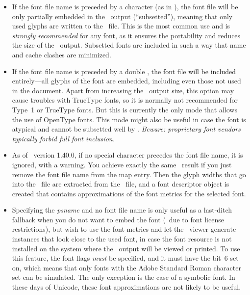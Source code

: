 \documentclass{pdftexmanual}
\begin{document}
\begin{itemize}
\item  If the font file name is preceded by a \type{<} character
       (as in ), the font file will be only partially
       embedded in the \PDF\ output (``subsetted''), meaning that only
       used glyphs are written to the \PDF\ file. This is the most
       common use and is \emph{strongly recommended} for any font, as it
       ensures the portability and reduces the size of the \PDF\ output.
       Subsetted fonts are included in such a way that name and cache
       clashes are minimized.

\item  If the font file name is preceded by a double \type{<<}, the font
       file will be included entirely---all glyphs of the font are
       embedded, including even those not used in the document. Apart
       from increasing the \PDF\ output size, this option may cause
       troubles with TrueType fonts, so it is normally not recommended
       for Type~1 or TrueType fonts. But this is currently the only mode
       that allows the use of OpenType fonts. This mode might also be
       useful in case the font is atypical and cannot be subsetted well
       by \PDFTEX. {\em Beware: proprietary font vendors typically
       forbid full font inclusion.}

\item  As of \PDFTEX\ version 1.40.0, if no special character precedes
       the font file name, it is ignored, with a warning. You achieve
       exactly the same \PDF\ result if you just remove the font file
       name from the map entry. Then the glyph widths that go into the
       \PDF~file are extracted from the \TFM~file, and a font descriptor
       object is created that contains approximations of the font
       metrics for the selected font.

\item  Specifying the {\em psname} and no font file name is only useful
       as a last-ditch fallback when you do not want to embed the font
       (\eg\ due to font license restrictions), but wish to use the font
       metrics and let the \PDF\ viewer generate instances that look
       close to the used font, in case the font resource is not
       installed on the system where the \PDF\ output will be viewed or
       printed. To use this feature, the font flags {\em must} be
       specified, and it must have the bit~6 set on, which means that
       only fonts with the Adobe Standard Roman character set can be
       simulated. The only exception is the case of a symbolic font.
       In these days of Unicode, these font approximations are not
       likely to be useful.
\end{itemize}
\end{document}
